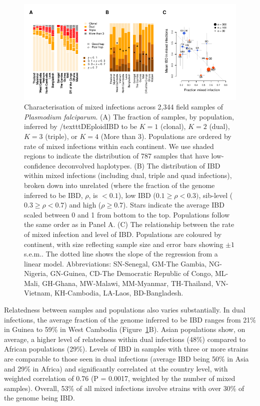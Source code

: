 \documentclass[9pt,lineno]{elife}
\begin{document}
\begin{figure}[ht]
  \begin{center}
    \includegraphics[width=\textwidth]{Fig3.pdf}
    \caption{Characterisation of mixed infections across 2,344 field samples of {\it Plasmodium falciparum}. (A) The fraction of samples, by population, inferred by /texttt{DEploidIBD} to be $K=1$ (clonal), $K=2$ (dual), $K=3$ (triple), or $K=4$ (More than 3).  Populations are ordered by rate of mixed infections within each continent. We use shaded regions to indicate the distribution of 787 samples that have low-confidence deconvolved haplotypes.  (B) The distribution of IBD within mixed infections (including dual, triple and quad infections), broken down into unrelated (where the fraction of the genome inferred to be IBD, $\rho$, is $< 0.1$), low IBD ($0.1 \geq \rho < 0.3)$, sib-level ($0.3 \geq \rho <0.7$) and high ($\rho \geq 0.7$). Stars indicate the average IBD scaled between 0 and 1 from bottom to the top.  Populations follow the same order as in Panel A.  (C) The relationship between the rate of mixed infection and level of IBD. Populations are coloured by continent, with size reflecting sample size and error bars showing $\pm 1$ s.e.m..  The dotted line shows the slope of the regression from a linear model.  Abbreviations: SN-Senegal, GM-The Gambia, NG-Nigeria, GN-Guinea, CD-The Democratic Republic of Congo, ML-Mali, GH-Ghana, MW-Malawi, MM-Myanmar, TH-Thailand, VN-Vietnam, KH-Cambodia, LA-Laos, BD-Bangladesh.} \label{fig:mixInfPlot}
  \end{center}
\end{figure}

Relatedness between samples and populations also varies substantially.  In dual infections, the average fraction of the genome inferred to be IBD ranges from 21\% in Guinea to 59\% in West Cambodia (Figure~\ref{fig:mixInfPlot}B).  Asian populations show, on average, a higher level of relatedness within dual infections (48\%) compared to African populations (29\%).  Levels of IBD in samples with three or more strains are comparable to those seen in dual infections (average IBD being 50\% in Asia and 29\% in Africa) and significantly correlated at the country level, with weighted correlation of 0.76 (P = 0.0017, weighted by the number of mixed samples).  Overall, 53\% of all mixed infections involve strains with over 30\% of the genome being IBD.
\end{document}
